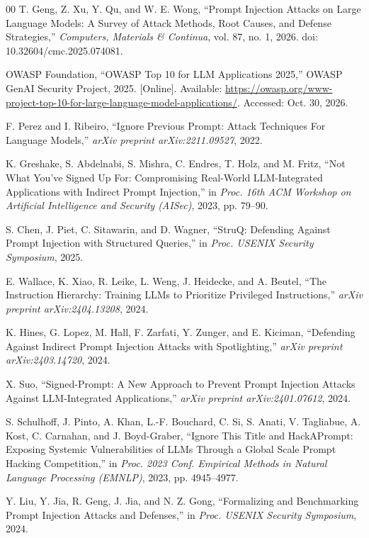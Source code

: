 \documentclass[twocolumn]{article}
\begin{document}
\begin{thebibliography}{00}
T. Geng, Z. Xu, Y. Qu, and W. E. Wong, ``Prompt Injection Attacks on Large Language Models: A Survey of Attack Methods, Root Causes, and Defense Strategies,'' \textit{Computers, Materials \& Continua}, vol. 87, no. 1, 2026. doi: 10.32604/cmc.2025.074081.

OWASP Foundation, ``OWASP Top 10 for LLM Applications 2025,'' OWASP GenAI Security Project, 2025. [Online]. Available: \url{https://owasp.org/www-project-top-10-for-large-language-model-applications/}. Accessed: Oct. 30, 2026.

F. Perez and I. Ribeiro, ``Ignore Previous Prompt: Attack Techniques For Language Models,'' \textit{arXiv preprint arXiv:2211.09527}, 2022.

K. Greshake, S. Abdelnabi, S. Mishra, C. Endres, T. Holz, and M. Fritz, ``Not What You've Signed Up For: Compromising Real-World LLM-Integrated Applications with Indirect Prompt Injection,'' in \textit{Proc. 16th ACM Workshop on Artificial Intelligence and Security (AISec)}, 2023, pp. 79--90.

S. Chen, J. Piet, C. Sitawarin, and D. Wagner, ``StruQ: Defending Against Prompt Injection with Structured Queries,'' in \textit{Proc. USENIX Security Symposium}, 2025.

E. Wallace, K. Xiao, R. Leike, L. Weng, J. Heidecke, and A. Beutel, ``The Instruction Hierarchy: Training LLMs to Prioritize Privileged Instructions,'' \textit{arXiv preprint arXiv:2404.13208}, 2024.

K. Hines, G. Lopez, M. Hall, F. Zarfati, Y. Zunger, and E. Kiciman, ``Defending Against Indirect Prompt Injection Attacks with Spotlighting,'' \textit{arXiv preprint arXiv:2403.14720}, 2024.

X. Suo, ``Signed-Prompt: A New Approach to Prevent Prompt Injection Attacks Against LLM-Integrated Applications,'' \textit{arXiv preprint arXiv:2401.07612}, 2024.

S. Schulhoff, J. Pinto, A. Khan, L.-F. Bouchard, C. Si, S. Anati, V. Tagliabue, A. Kost, C. Carnahan, and J. Boyd-Graber, ``Ignore This Title and HackAPrompt: Exposing Systemic Vulnerabilities of LLMs Through a Global Scale Prompt Hacking Competition,'' in \textit{Proc. 2023 Conf. Empirical Methods in Natural Language Processing (EMNLP)}, 2023, pp. 4945--4977.

Y. Liu, Y. Jia, R. Geng, J. Jia, and N. Z. Gong, ``Formalizing and Benchmarking Prompt Injection Attacks and Defenses,'' in \textit{Proc. USENIX Security Symposium}, 2024.


\end{thebibliography}
\end{document}
